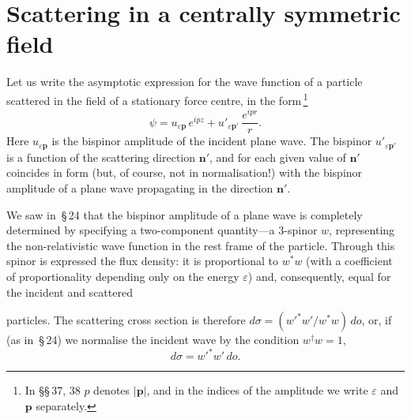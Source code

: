 \section{Scattering in a centrally symmetric field}

Let us write the asymptotic expression for the wave function of a particle scattered in the field of a stationary force centre, in the form\,\footnote{In \S\S\,37, 38 $p$ denotes $|\mathbf{p}|$, and in the indices of the amplitude we write $\varepsilon$ and $\mathbf{p}$ separately.}
\begin{equation}
\psi = u_{\varepsilon\mathbf{p}}\,e^{ipz} + u'_{\varepsilon\mathbf{p}'}\,\frac{e^{ipr}}{r}.
\tag{37.1}
\end{equation}
Here $u_{\varepsilon\mathbf{p}}$ is the bispinor amplitude of the incident plane wave. The bispinor $u'_{\varepsilon\mathbf{p}'}$ is a function of the scattering direction $\mathbf{n}'$, and for each given value of $\mathbf{n}'$ coincides in form (but, of course, not in normalisation!) with the bispinor amplitude of a plane wave propagating in the direction $\mathbf{n}'$.

We saw in~\S\,24 that the bispinor amplitude of a plane wave is completely determined by specifying a two-component quantity---a 3-spinor $w$, representing the non-relativistic wave function in the rest frame of the particle. Through this spinor is expressed the flux density: it is proportional to $w^*w$ (with a coefficient of proportionality depending only on the energy $\varepsilon$) and, consequently, equal for the incident and scattered

particles. The scattering cross section is therefore $d\sigma = (w'^*w'/w^*w)\,do$, or, if (as in~\S\,24) we normalise the incident wave by the condition $w^\dagger w = 1$,
\[
d\sigma = w'^*w'\,do.
\]

